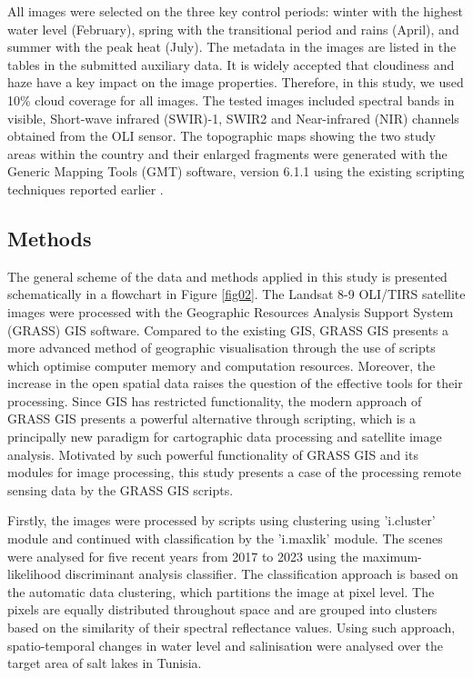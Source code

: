 \documentclass[land,article,accept,pdftex,moreauthors]{Definitions/mdpi}
\begin{document}
All images were selected on the three key control periods: winter with the highest water level (February), spring with the transitional period and rains (April), and summer with the peak heat (July). The metadata in the images are listed in the tables in the {submitted auxiliary data}. It is widely accepted that cloudiness and haze have a key impact on the image properties. Therefore, in this study, we used 10\% cloud coverage for all images. The tested images included spectral bands in visible, Short-wave infrared (SWIR)-1, SWIR2 and Near-infrared (NIR) channels obtained from the OLI sensor. The topographic maps showing the two study areas within the country and their enlarged fragments were generated with the Generic Mapping Tools (GMT) software, version  6.1.1 \cite{Wessel} using the existing scripting techniques reported earlier \cite{Lemenkova202212,Lemenkova202206,Lemenkova202203}. 

\subsection{Methods}

The general scheme of the data and methods applied in this study is presented schematically in a flowchart in Figure \ref{fig02}. The Landsat 8-9 OLI/TIRS satellite images were processed with the Geographic Resources Analysis Support System (GRASS) {GIS} software. Compared to the existing GIS{, }GRASS GIS presents a {more} advanced method of geographic visualisation {through the use of} scripts {which }optimise {computer} memory and computation resources{. Moreover}, the increase in the open spatial data raises the question of the effective tools for their processing. Since GIS has restricted functionality, the modern approach {of} GRASS GIS {presents} a powerful alternative through scripting, which {is} a principally new paradigm for cartographic data processing and satellite image analysis. Motivated by {such }powerful functionality of GRASS GIS and its modules for image processing, this study presents a case of {the }processing remote sensing data by {the GRASS GIS }scripts. 

{Firstly,} the images were processed by scripts using clustering using 'i.cluster' module and continued with classification by the 'i.maxlik' module. The scenes were analysed for {five} recent years from 2017 to 2023 using the maximum-likelihood discriminant analysis classifier. {The classification approach is based on the automatic data clustering, which partitions the image at pixel level. The pixels are equally distributed throughout space and are grouped into clusters based on the similarity of their spectral reflectance values. Using such approach, spatio-temporal} changes {in} water level and salinisation {were analysed}  {over the }target {area of }salt lakes in Tunisia{. }
\end{document}
